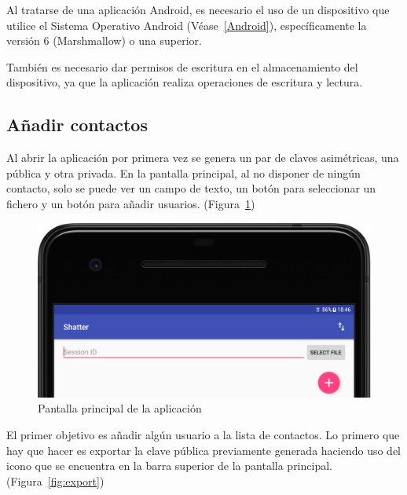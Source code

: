 Al tratarse de una aplicación Android, es necesario el uso de un dispositivo que utilice el Sistema Operativo Android (Véase~\ref{Android}), específicamente la versión 6 (Marshmallow) o una superior.

También es necesario dar permisos de escritura en el almacenamiento del dispositivo, ya que la aplicación realiza operaciones de escritura y lectura.

\subsection{Añadir contactos}

Al abrir la aplicación por primera vez se genera un par de claves asimétricas, una pública y otra privada. En la pantalla principal, al no disponer de ningún contacto, solo se puede ver un campo de texto, un botón para seleccionar un fichero y un botón para añadir usuarios. (Figura~\ref{fig:home})

\begin{figure}[!htb]
  \centering
  \includegraphics[scale=0.4]{Figures/home}
  \decoRule
  \caption[Shatter (Home)]{Pantalla principal de la aplicación}
  \label{fig:home}
\end{figure}

El primer objetivo es añadir algún usuario a la lista de contactos. Lo primero que hay que hacer es exportar la clave pública previamente generada haciendo uso del icono que se encuentra en la barra superior de la pantalla principal. (Figura~\ref{fig:export})

